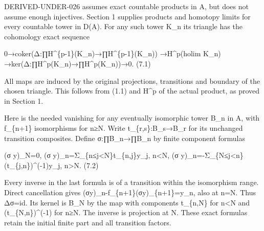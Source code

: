 \documentclass[11pt]{article}
\begin{document}
DERIVED-UNDER-026 assumes exact countable products in A,\allowbreak{} but does not assume enough injectives. Section 1 supplies products and homotopy limits for every countable tower in D(A)\allowbreak{}. For any such tower K\_\allowbreak{}n its triangle has the cohomology exact sequence

\begingroup\raggedright
0\allowbreak{}→coker(Δ:\allowbreak{}∏H\textasciicircum{}\{p-1\}(K\_\allowbreak{}n)\allowbreak{}\allowbreak{}→∏H\textasciicircum{}\{p-1\}(K\_\allowbreak{}n)\allowbreak{})\allowbreak{} \allowbreak{}→H\textasciicircum{}p(holim K\_\allowbreak{}n)\allowbreak{} \allowbreak{}→ker(Δ:\allowbreak{}∏H\textasciicircum{}p(K\_\allowbreak{}n)\allowbreak{}\allowbreak{}→∏H\textasciicircum{}p(K\_\allowbreak{}n)\allowbreak{})\allowbreak{}\allowbreak{}→0. (7.1)\allowbreak{}
\par\endgroup

All maps are induced by the original projections,\allowbreak{} transitions and boundary of the chosen triangle. This follows from (1.1)\allowbreak{} and H\^{}p of the actual product,\allowbreak{} as proved in Section 1.

Here is the needed vanishing for any eventually isomorphic tower B\_\allowbreak{}n in A,\allowbreak{} with f\_\allowbreak{}\{n\allowbreak{}+1\} isomorphisms for n≥N. Write t\_\allowbreak{}\{r,\allowbreak{}s\}:\allowbreak{}B\_\allowbreak{}s\allowbreak{}→B\_\allowbreak{}r for its unchanged transition composites. Define σ:\allowbreak{}∏B\_\allowbreak{}n\allowbreak{}→∏B\_\allowbreak{}n by finite component formulas

(σ y)\allowbreak{}\_\allowbreak{}N\allowbreak{}=0,\allowbreak{} (σ y)\allowbreak{}\_\allowbreak{}n\allowbreak{}=Σ\_\allowbreak{}\{n≤j<N\}t\_\allowbreak{}\{n,\allowbreak{}j\}y\_\allowbreak{}j,\allowbreak{} n<N,\allowbreak{} (σ y)\allowbreak{}\_\allowbreak{}n\allowbreak{}=-Σ\_\allowbreak{}\{N≤j<n\}(t\_\allowbreak{}\{j,\allowbreak{}n\})\allowbreak{}\textasciicircum{}(-1)\allowbreak{}y\_\allowbreak{}j,\allowbreak{} n\textgreater N. (7.2)\allowbreak{}

Every inverse in the last formula is of a transition within the isomorphism range. Direct cancellation gives (σy)\allowbreak{}\_\allowbreak{}n-f\_\allowbreak{}\{n\allowbreak{}+1\}(σy)\allowbreak{}\_\allowbreak{}\{n\allowbreak{}+1\}\allowbreak{}=y\_\allowbreak{}n,\allowbreak{} also at n\allowbreak{}=N. Thus Δσ\allowbreak{}=id. Its kernel is B\_\allowbreak{}N by the map with components t\_\allowbreak{}\{n,\allowbreak{}N\} for n\textless N and (t\_\allowbreak{}\{N,\allowbreak{}n\})\allowbreak{}\textasciicircum{}(-1)\allowbreak{} for n≥N. The inverse is projection at N. These exact formulas retain the initial finite part and all transition factors.
\end{document}
